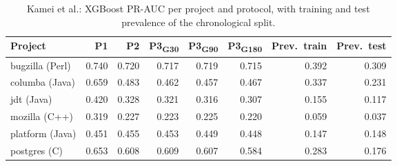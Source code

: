 \begin{table}[h]
\centering
\caption{Kamei et al.: XGBoost PR-AUC per project and protocol, with training and test prevalence of the chronological split.}
\label{tab:perprojectk}
\small
\begin{tabular}{lrrrrrrr}
\toprule
Project & P1 & P2 & P3\textsubscript{G30} & P3\textsubscript{G90} & P3\textsubscript{G180} & Prev.\ train & Prev.\ test \\
\midrule
bugzilla (Perl)   & 0.740 & 0.720 & 0.717 & 0.719 & 0.715 & 0.392 & 0.309 \\
columba (Java)    & 0.659 & 0.483 & 0.462 & 0.457 & 0.467 & 0.337 & 0.231 \\
jdt (Java)        & 0.420 & 0.328 & 0.321 & 0.316 & 0.307 & 0.155 & 0.117 \\
mozilla (C++)     & 0.319 & 0.227 & 0.223 & 0.225 & 0.220 & 0.059 & 0.037 \\
platform (Java)   & 0.451 & 0.455 & 0.453 & 0.449 & 0.448 & 0.147 & 0.148 \\
postgres (C)      & 0.653 & 0.608 & 0.609 & 0.607 & 0.584 & 0.283 & 0.176 \\
\bottomrule
\end{tabular}
\end{table}


